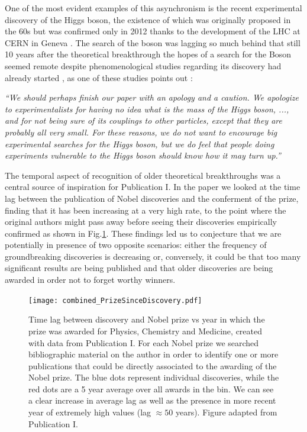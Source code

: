 One of the most evident examples of this asynchronism is the recent experimental discovery of the Higgs
boson, the existence of which was originally proposed in the 60s \cite{PhysRevLett.13.508} but was confirmed only in 2012 thanks to the development of the LHC at CERN in Geneva \cite{Aad20121}. The search of the boson was lagging so much behind that still 10 years after the 
theoretical breakthrough the hopes of a search for the Boson seemed remote despite phenomenological studies regarding its discovery had already started \cite{1201.6045}, as one of these studies points out \cite{ELLIS1976292} :

\textit{“We should perhaps finish our paper with an apology and a caution.
We apologize to experimentalists for having no idea what is the mass of the Higgs
boson, ..., and for not being sure of its couplings to other particles, except that they are
probably all very small. For these reasons, we do not want to encourage big experimental
searches for the Higgs boson, but we do feel that people doing experiments vulnerable to the
Higgs boson should know how it may turn up.”} 

The temporal aspect of recognition of older theoretical breakthroughs was a central source of inspiration for Publication I. In the paper we looked at the time lag between the publication of Nobel discoveries and 
the conferment of the prize, finding that it has been increasing at a very high rate, to the point where the original authors might pass away before seeing their discoveries empirically confirmed as shown
in Fig.\ref{fig:nobel_delay}. These findings
led us to conjecture that we are potentially in presence of two opposite scenarios: either the frequency of groundbreaking discoveries is
decreasing or, conversely, it could be that too many significant results are being published and that older discoveries are being awarded in order not to forget worthy winners.

 \begin{figure}[h]
\centering
\texttt{[image: combined\_PrizeSinceDiscovery.pdf]}%
\caption{Time lag between discovery and Nobel prize vs year in which the prize was awarded for Physics, Chemistry and Medicine, created with data from Publication I. For each Nobel prize we searched bibliographic material on the author in order to
identify one or more publications that could be directly associated to the awarding of the Nobel prize. The blue dots represent individual discoveries, while the red dots
are a 5 year average over all awards in the bin. We can see a clear increase in average lag as well as the presence in more recent year of extremely high values (lag $\approx 50$ years). Figure adapted from Publication I.}
\label{fig:nobel_delay}
\end{figure}


